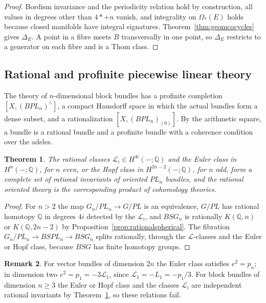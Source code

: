 \documentclass[11pt]{amsart}
\theoremstyle{plain}
\newtheorem{theorem}{Theorem}[section]
\theoremstyle{definition}
\newtheorem{remark}[theorem]{Remark}
\numberwithin{equation}{section}
\newcommand{\Q}{\mathbb{Q}}
\begin{document}
\begin{proof}
Bordism invariance and the periodicity relation hold by construction, all values in degrees other than $4*+n$ vanish, and integrality on $\Omega_*(E)$ holds because closed manifolds have integral signatures.
Theorem~\ref{thm:geomcocycles} gives $\Delta_E$.
A point in a fibre meets $B$ transversally in one point, so $\Delta_E$ restricts to a generator on each fibre and is a Thom class.
\end{proof}

\subsection{Rational and profinite piecewise linear theory}
The theory of $n$-dimensional block bundles has a profinite completion $[X,(BPL_n)^\wedge]$, a compact Hausdorff space in which the actual bundles form a dense subset, and a rationalization $[X,(BPL_n)_{(0)}]$.
By the arithmetic square, a bundle is a rational bundle and a profinite bundle with a coherence condition over the adeles.

\begin{theorem}\label{thm:PLrational}
The rational classes $\mathcal L_i\in H^{4i}(-;\Q)$ and the Euler class in $H^n(-;\Q)$, for $n$ even, or the Hopf class in $H^{2n-2}(-;\Q)$, for $n$ odd, form a complete set of rational invariants of oriented $PL_n$ bundles, and the rational oriented theory is the corresponding product of cohomology theories.
\end{theorem}

\begin{proof}
For $n>2$ the map $G_n/PL_n\to G/PL$ is an equivalence, $G/PL$ has rational homotopy $\Q$ in degrees $4i$ detected by the $\mathcal L_i$, and $BSG_n$ is rationally $K(\Q,n)$ or $K(\Q,2n-2)$ by Proposition~\ref{prop:rationalspherical}.
The fibration $G_n/PL_n\to BSPL_n\to BSG_n$ splits rationally, through the $\mathcal L$-classes and the Euler or Hopf class, because $BSG$ has finite homotopy groups.
\end{proof}

\begin{remark}
For vector bundles of dimension $2n$ the Euler class satisfies $e^2=p_n$; in dimension two $e^2=p_1=-3\mathcal L_1$, since $\mathcal L_1=-L_1=-p_1/3$.
For block bundles of dimension $n\ge3$ the Euler or Hopf class and the classes $\mathcal L_i$ are independent rational invariants by Theorem~\ref{thm:PLrational}, so these relations fail.
\end{remark}
\end{document}
